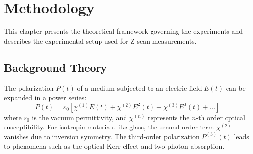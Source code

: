 %
%
%

\chapter{Methodology}
\label{ch:methodology}

This chapter presents the theoretical framework governing the experiments and describes the experimental setup used for Z-scan measurements.

\section{Background Theory}
The polarization $P(t)$ of a medium subjected to an electric field $E(t)$ can be expanded in a power series:
\begin{equation}
    P(t) = \varepsilon_0 \left[ \chi^{(1)} E(t) + \chi^{(2)} E^2(t) + \chi^{(3)} E^3(t) + \dots \right]
    \label{eq:polarization}
\end{equation}
where $\varepsilon_0$ is the vacuum permittivity, and $\chi^{(n)}$ represents the $n$-th order optical susceptibility. For isotropic materials like glass, the second-order term $\chi^{(2)}$ vanishes due to inversion symmetry. The third-order polarization $P^{(3)}(t)$ leads to phenomena such as the optical Kerr effect and two-photon absorption.


